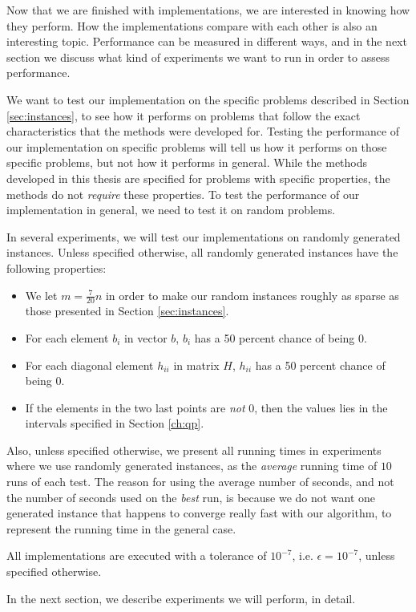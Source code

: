 Now that we are finished with implementations, we are interested in knowing
how they perform.
How the implementations compare with each other is also an interesting topic.
Performance can be measured in different ways, and in the next section we
discuss what kind of experiments we want to run in order to assess performance.

We want to test our implementation on the specific problems described in
Section \ref{sec:instances}, to see how it performs on problems that follow
the exact characteristics that the methods were developed for.
Testing the performance of our implementation on specific problems will tell us
how it performs on those specific problems, but not how it performs in general.
While the methods developed in this thesis are specified for problems with
specific properties, the methods do not \emph{require} these properties.
To test the performance of our implementation in general, we need to test it
on random problems.

In several experiments, we will test our implementations on randomly generated
instances.
Unless specified otherwise, all randomly generated instances have
the following properties:
\begin{itemize}
\item We let $m = \frac{7}{20}n$ in order to make our random instances roughly as
      sparse as those presented in Section \ref{sec:instances}.
\item For each element $b_i$ in vector $b$, $b_i$ has a 50 percent chance of being 0.
\item For each diagonal element $h_{ii}$ in matrix $H$, $h_{ii}$ has a 50 percent
      chance of being 0.
\item If the elements in the two last points are \emph{not} 0, then the values lies in
      the intervals specified in Section \ref{ch:qp}.
\end{itemize}

Also, unless specified otherwise, we present all running times in experiments where
we use randomly generated instances, as the \emph{average} running time of
$10$ runs of each test. The reason for using the average number of seconds, and
not the number of seconds used on the \emph{best} run, is because we do not want
one generated instance that happens to converge really fast with our algorithm,
to represent the running time in the general case.

All implementations are executed with a tolerance of $10^{-7}$, i.e.
$\epsilon = 10^{-7}$, unless specified otherwise.

In the next section, we describe experiments we will perform, in detail.
